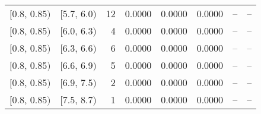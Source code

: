 \begin{longtable}{| l | l | r | r | r | r | r | r |}
        $[$0.8, 0.85$)$ & $[$5.7, 6.0$)$ & 12 & 0.0000 & 0.0000 & 0.0000 & -- & -- \\
        $[$0.8, 0.85$)$ & $[$6.0, 6.3$)$ & 4 & 0.0000 & 0.0000 & 0.0000 & -- & -- \\
        $[$0.8, 0.85$)$ & $[$6.3, 6.6$)$ & 6 & 0.0000 & 0.0000 & 0.0000 & -- & -- \\
        $[$0.8, 0.85$)$ & $[$6.6, 6.9$)$ & 5 & 0.0000 & 0.0000 & 0.0000 & -- & -- \\
        $[$0.8, 0.85$)$ & $[$6.9, 7.5$)$ & 2 & 0.0000 & 0.0000 & 0.0000 & -- & -- \\
        $[$0.8, 0.85$)$ & $[$7.5, 8.7$)$ & 1 & 0.0000 & 0.0000 & 0.0000 & -- & -- \\
\end{longtable}
